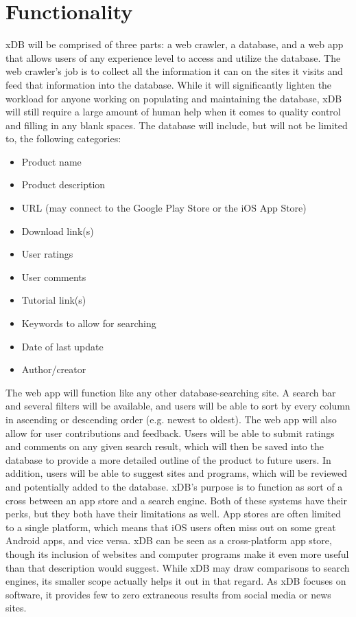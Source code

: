 \documentclass[letterpaper,12pt,titlepage]{article}
\begin{document}
\section{Functionality}
xDB will be comprised of three parts: a web crawler, a database, and a web app that allows users of any experience level to access and utilize the database. 
The web crawler's job is to collect all the information it can on the sites it visits and feed that information into the database. While it will significantly lighten the workload for anyone working on populating and maintaining the database, xDB will still require a large amount of human help when it comes to quality control and filling in any blank spaces. 
The database will include, but will not be limited to, the following categories:
\begin{itemize}
	\item Product name
	\item Product description
	\item URL (may connect to the Google Play Store or the iOS App Store)
	\item Download link(s)
	\item User ratings
	\item User comments
	\item Tutorial link(s)
	\item Keywords to allow for searching
	\item Date of last update
	\item Author/creator
\end{itemize}

The web app will function like any other database-searching site. A search bar and several filters will be available, and users will be able to sort by every column in ascending or descending order (e.g. newest to oldest). The web app will also allow for user contributions and feedback. Users will be able to submit ratings and comments on any given search result, which will then be saved into the database to provide a more detailed outline of the product to future users. In addition, users will be able to suggest sites and programs, which will be reviewed and potentially added to the database. 
xDB's purpose is to function as sort of a cross between an app store and a search engine. Both of these systems have their perks, but they both have their limitations as well. App stores are often limited to a single platform, which means that iOS users often miss out on some great Android apps, and vice versa. xDB can be seen as a cross-platform app store, though its inclusion of websites and computer programs make it even more useful than that description would suggest. While xDB may draw comparisons to search engines, its smaller scope actually helps it out in that regard. As xDB focuses on software, it provides few to zero extraneous results from social media or news sites. 
\end{document}
